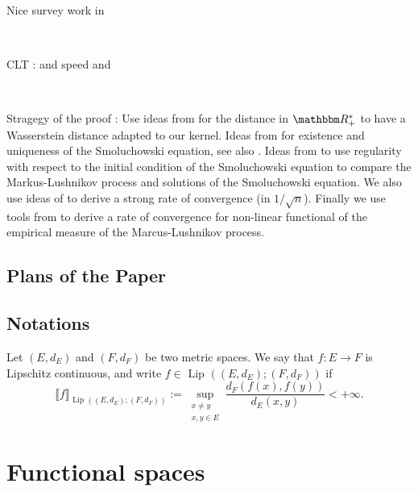 \documentclass[a4paper,11pt, reqno]{amsart}
\newcommand{\1}{\mathbbm{1}}
\newcommand{\assign}{:=}
\theoremstyle{plain}
\theoremstyle{definition}
\begin{document}
Nice survey work in {\cite{laurencotWeakCompactnessTechniques2015a}}

\

CLT : {\cite{deaconuPureJumpMarkov2002}} and
{\cite{kolokoltsovCentralLimitTheorem2008}} speed
{\cite{cepedaSmoluchowskisEquationRate2011a}} and
{\cite{kyprianouUniversalityClassFragmentationcoalescence2018}}

\

Stragegy of the proof : Use ideas from
{\cite{cepedaSmoluchowskisEquationRate2011a}} for the distance in
$\RR_+^{\ast}$ to have a Wasserstein distance adapted to our kernel.
Ideas from {\cite{norrisSmoluchowskisCoagulationEquation1999}} for existence
and uniqueness of the Smoluchowski equation, see also
{\cite{norrisClusterCoagulation2000}}. Ideas from
{\cite{kolokoltsovCentralLimitTheorem2008}} to use regularity with respect to
the initial condition of the Smoluchowski equation to compare the
Markus-Lushnikov process and solutions of the Smoluchowski equation. We also
use ideas of {\cite{kyprianouUniversalityClassFragmentationcoalescence2018}}
to derive a strong rate of convergence (in $1 / \sqrt{n}$). Finally we use
tools from {\cite{martiniKolmogorovEquationsSpaces2023}} to derive a rate of
convergence for non-linear functional of the empirical measure of the
Marcus-Lushnikov process.

\subsection{Plans of the Paper}

\subsection{Notations}

Let $(E, d_E)$ and $(F, d_F)$ be two metric spaces. We say that $f : E
\rightarrow F$ is Lipschitz continuous, and write $f \in  \text{ Lip } ((E, d_E)
; (F, d_F))$ if
\[ \llbracket f \rrbracket_{ \text{ Lip } ((E, d_E) ; (F, d_F))} \assign
   \underset{\begin{array}{c}
     x \neq y\\
     x, y \in E
   \end{array}}{\sup} \frac{d_F (f (x), f (y))}{d_E (x, y)} < + \infty . \]

\section{Functional spaces}
\end{document}
